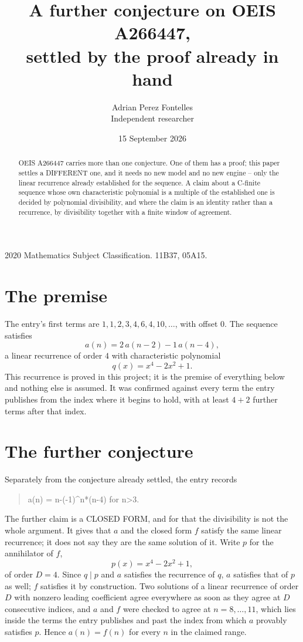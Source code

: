 \documentclass[11pt,a4paper]{article}
\title{A further conjecture on OEIS A266447,\\ \large settled by the proof already in hand}
\author{Adrian Perez Fontelles\\ \small Independent researcher}
\date{15 September 2026}
\theoremstyle{plain}
\theoremstyle{definition}
\begin{document}
\maketitle

\begin{abstract}
OEIS A266447 carries more than one conjecture. One of them has a proof; this paper settles a
DIFFERENT one, and it needs no new model and no new engine -- only the linear recurrence already
established for the sequence. A claim about a C-finite sequence whose own characteristic
polynomial is a multiple of the established one is decided by polynomial divisibility, and where
the claim is an identity rather than a recurrence, by divisibility together with a finite window
of agreement.
\end{abstract}

\noindent\small 2020 Mathematics Subject Classification. 11B37, 05A15.\normalsize

\section{The premise}

The entry's first terms are $1, 1, 2, 3, 4, 6, 4, 10,\dots$, with offset $0$. The sequence satisfies
\[
  a(n)=2\,a(n-2) - 1\,a(n-4) ,
\]
a linear recurrence of order $4$ with characteristic polynomial
\[
  q(x)=x^{4} - 2 x^{2} + 1 .
\]
This recurrence is proved in this project; it is the premise of everything below and nothing else is assumed.
It was confirmed against every term the entry publishes from the index where it begins to hold,
with at least $4+2$ further terms after that index.

\section{The further conjecture}

Separately from the conjecture already settled, the entry records

\begin{quote}\raggedright a(n) = n-(-1)\^{}n*(n-4) for n>3.\end{quote}

The further claim is a CLOSED FORM, and for that the divisibility is not the whole argument. It
gives that $a$ and the closed form $f$ satisfy the same linear recurrence; it does not say they
are the same solution of it. Write $p$ for the annihilator of $f$,
\[
  p(x)=x^{4} - 2 x^{2} + 1 ,
\]
of order $D=4$. Since $q\mid p$ and $a$ satisfies the recurrence of $q$, $a$ satisfies that of
$p$ as well; $f$ satisfies it by construction. Two solutions of a linear recurrence of order $D$
with nonzero leading coefficient agree everywhere as soon as they agree at $D$ consecutive
indices, and $a$ and $f$ were checked to agree at $n=8,\dots,11$,
which lies inside the terms the entry publishes and past the index from which $a$ provably
satisfies $p$. Hence $a(n)=f(n)$ for every $n$ in the claimed range.
\end{document}
